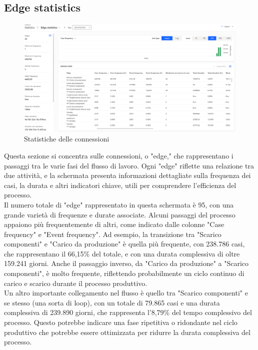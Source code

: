 \documentclass{article}
\begin{document}
\subsection{Edge statistics}
\begin{figure}[H]
    \centering
    \includegraphics[width=\textwidth]{imgMicrosoft/DatiReali/StatisticsEdgeStatisticsDatiReali.png}
    \caption{Statistiche delle connessioni}
    \label{fig:edge-statistics}
\end{figure}
Questa sezione si concentra sulle connessioni, o "edge," che rappresentano i passaggi tra le varie fasi del flusso di lavoro. Ogni "edge" riflette una relazione tra due attività, e la schermata presenta informazioni dettagliate sulla frequenza dei casi, la durata e altri indicatori chiave, utili per comprendere l'efficienza del processo.\\
Il numero totale di "edge" rappresentato in questa schermata è 95, con una grande varietà di frequenze e durate associate. Alcuni passaggi del processo appaiono più frequentemente di altri, come indicato dalle colonne "Case frequency" e "Event frequency". Ad esempio, la transizione tra "Scarico componenti" e "Carico da produzione" è quella più frequente, con 238.786 casi, che rappresentano il 66,15\% del totale, e con una durata complessiva di oltre 159.241 giorni. Anche il passaggio inverso, da "Carico da produzione" a "Scarico componenti", è molto frequente, riflettendo probabilmente un ciclo continuo di carico e scarico durante il processo produttivo.\\
Un altro importante collegamento nel flusso è quello tra "Scarico componenti" e se stesso (una sorta di loop), con un totale di 79.865 casi e una durata complessiva di 239.890 giorni, che rappresenta l'8,79\% del tempo complessivo del processo. Questo potrebbe indicare una fase ripetitiva o ridondante nel ciclo produttivo che potrebbe essere ottimizzata per ridurre la durata complessiva del processo.\\
\end{document}
